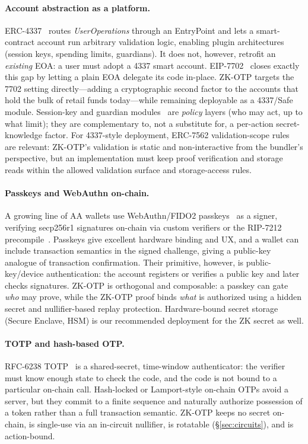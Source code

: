 \documentclass[11pt]{article}
\theoremstyle{definition}
\theoremstyle{plain}
\begin{document}
\paragraph{Account abstraction as a platform.} ERC-4337~\cite{erc4337} routes
\emph{UserOperations} through an EntryPoint and lets a smart-contract account run
arbitrary validation logic, enabling plugin architectures (session keys, spending
limits, guardians). It does not, however, retrofit an \emph{existing} EOA: a user
must adopt a 4337 smart account. EIP-7702~\cite{eip7702} closes exactly this gap by
letting a plain EOA delegate its code in-place. ZK-OTP targets the 7702 setting
directly---adding a cryptographic second factor to the accounts that hold the bulk of
retail funds today---while remaining deployable as a 4337/Safe module. Session-key and
guardian modules~\cite{safe} are \emph{policy} layers (who may act, up to what limit);
they are complementary to, not a substitute for, a per-action secret-knowledge factor.
For 4337-style deployment, ERC-7562 validation-scope rules~\cite{erc7562} are relevant:
ZK-OTP's validation is static and non-interactive from the bundler's perspective, but
an implementation must keep proof verification and storage reads within the allowed
validation surface and storage-access rules.

\paragraph{Passkeys and WebAuthn on-chain.} A growing line of AA wallets use
WebAuthn/FIDO2 passkeys~\cite{webauthn} as a signer, verifying secp256r1 signatures
on-chain via custom verifiers or the RIP-7212 precompile~\cite{rip7212}. Passkeys give
excellent hardware binding and UX, and a wallet can include transaction semantics in
the signed challenge, giving a public-key analogue of transaction confirmation. Their
primitive, however, is public-key/device authentication:
the account registers or verifies a public key and later checks signatures. ZK-OTP is
orthogonal and composable: a passkey can gate \emph{who} may prove, while the ZK-OTP
proof binds \emph{what} is authorized using a hidden secret and nullifier-based replay
protection. Hardware-bound secret storage (Secure Enclave, HSM) is our recommended
deployment for the ZK secret as well.

\paragraph{TOTP and hash-based OTP.} RFC-6238 TOTP~\cite{totp} is a shared-secret,
time-window authenticator: the verifier must know enough state to check the code, and
the code is not bound to a particular on-chain call. Hash-locked or Lamport-style
on-chain OTPs avoid a server, but they commit to a finite sequence and naturally
authorize possession of a token rather than a full transaction semantic. ZK-OTP keeps
no secret on-chain, is single-use via an in-circuit nullifier, is rotatable
(\S\ref{sec:circuits}), and is action-bound.
\end{document}
